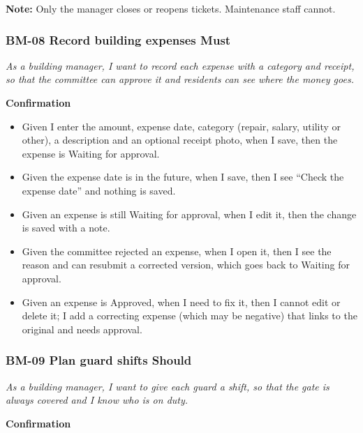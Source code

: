 \documentclass[11pt,a4paper]{report}
\begin{document}
\textbf{Note:} Only the manager closes or reopens tickets. Maintenance staff cannot.

\subsubsection*{BM-08 \textperiodcentered{} Record building expenses \textperiodcentered{} Must}

\emph{As a building manager, I want to record each expense with a category and receipt, so that the committee can approve it and residents can see where the money goes.}

\medskip\noindent\textbf{Confirmation}\par

\begin{itemize}
  \item Given I enter the amount, expense date, category (repair, salary, utility or other), a description and an optional receipt photo, when I save, then the expense is Waiting for approval.
  \item Given the expense date is in the future, when I save, then I see ``Check the expense date'' and nothing is saved.
  \item Given an expense is still Waiting for approval, when I edit it, then the change is saved with a note.
  \item Given the committee rejected an expense, when I open it, then I see the reason and can resubmit a corrected version, which goes back to Waiting for approval.
  \item Given an expense is Approved, when I need to fix it, then I cannot edit or delete it; I add a correcting expense (which may be negative) that links to the original and needs approval.
\end{itemize}

\subsubsection*{BM-09 \textperiodcentered{} Plan guard shifts \textperiodcentered{} Should}

\emph{As a building manager, I want to give each guard a shift, so that the gate is always covered and I know who is on duty.}

\medskip\noindent\textbf{Confirmation}\par
\end{document}
